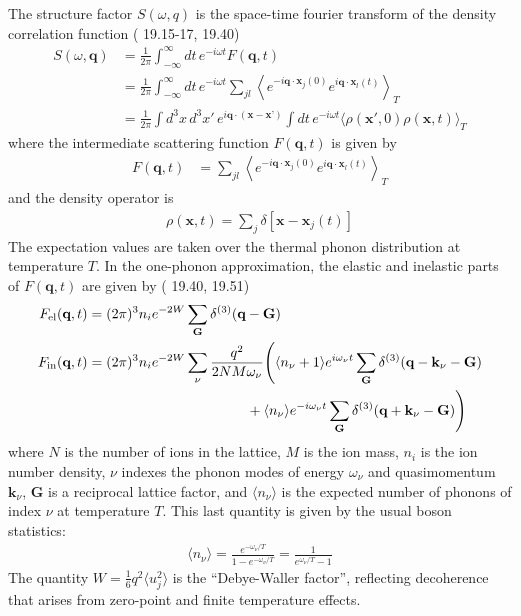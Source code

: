 \documentclass{article}
\begin{document}
The structure factor $S(\omega, q)$ is the space-time fourier transform of the density correlation function (\cite{quantum} 19.15-17, 19.40)
\begin{align}
S(\omega, \textbf{q}) &= \frac{1}{2 \pi} \int_{-\infty}^{\infty} dt \, e^{-i\omega t} F(\textbf{q}, t) \\
   &= \frac{1}{2 \pi} \int_{-\infty}^{\infty} dt\, e^{-i \omega t} \sum_{jl} \left\langle e^{-i\textbf{q}\cdot \textbf{x}_j(0)}e^{i\textbf{q}\cdot \textbf{x}_l(t)} \right\rangle_T \\
   &= \frac{1}{2 \pi} \int d^3 x \, d^3 x'\, e^{i \textbf{q}\cdot(\textbf{x} - \textbf{x'})} \int dt \, e^{-i \omega t} \langle \rho(\textbf{x}', 0) \rho(\textbf{x}, t) \rangle_T
\end{align}
where the intermediate scattering function $F(\textbf{q}, t)$ is given by
\begin{align}
F(\textbf{q}, t) &= \sum_{jl} \left\langle e^{-i\textbf{q}\cdot \textbf{x}_j(0)}e^{i\textbf{q}\cdot \textbf{x}_l(t)} \right\rangle_T
\end{align}
and the density operator is
\begin{align}
\rho(\textbf{x}, t) = \sum_j \delta[\textbf{x} - \textbf{x}_j(t)]
\end{align}
The expectation values are taken over the thermal phonon distribution at temperature $T$. In the one-phonon approximation, the elastic and inelastic parts of $F(\textbf{q}, t)$ are given by (\cite{quantum} 19.40, 19.51)
\begin{align}
F_\text{el}(\textbf{q}, t) &= (2 \pi)^3 n_i e^{-2 W} \sum_\textbf{G} \delta^{(3)}(\textbf{q} - \textbf{G}) \\
F_\text{in}(\textbf{q}, t) &= (2 \pi)^3 n_i e^{-2 W} \sum_\nu \frac{q^2}{2 NM \omega_\nu} \Bigg( \langle n_\nu + 1 \rangle e^{i \omega_\nu t} \sum_\textbf{G} \delta^{(3)}(\textbf{q} - \textbf{k}_\nu - \textbf{G}) \nonumber\\  & \hspace{4 cm} + \langle n_\nu \rangle e^{-i \omega_\nu t} \sum_\textbf{G} \delta^{(3)}(\textbf{q} + \textbf{k}_\nu - \textbf{G})  \Bigg)
\label{eq:Fin}
\end{align}
where $N$ is the number of ions in the lattice, $M$ is the ion mass, $n_i$ is the ion number density, $\nu$ indexes the phonon modes of energy $\omega_\nu$ and quasimomentum $\textbf{k}_\nu$, $\textbf{G}$ is a reciprocal lattice factor, and $\langle n_\nu \rangle$ is the expected number of phonons of index $\nu$ at temperature $T$. This last quantity is given by the usual boson statistics:
\begin{align}
\langle n_\nu \rangle = \frac{e^{-\omega_\nu/T}}{1-e^{-\omega_\nu/T}} = \frac{1}{e^{\omega_\nu/T} - 1}
\end{align}
The quantity $W = \frac16 q^2 \langle u_j^2 \rangle$ is the ``Debye-Waller factor'', reflecting decoherence that arises from zero-point and finite temperature effects.
\end{document}
